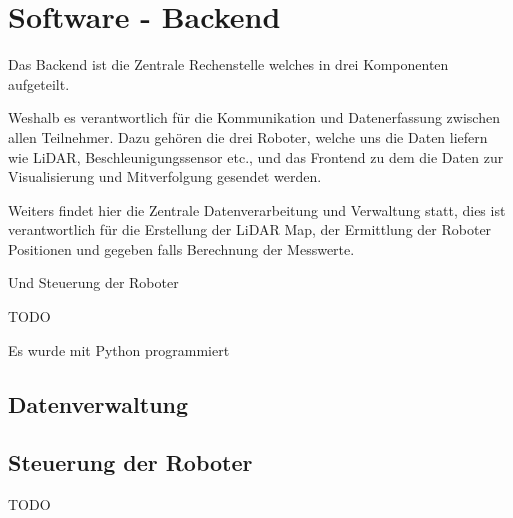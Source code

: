 
\chapter{Software - Backend}
\label{sec:software_backend}
Das Backend ist die Zentrale Rechenstelle welches in drei Komponenten aufgeteilt.

Weshalb es verantwortlich für die Kommunikation und Datenerfassung zwischen allen Teilnehmer. 
Dazu gehören die drei Roboter, welche uns die Daten liefern wie LiDAR, Beschleunigungssensor etc., 
und das Frontend zu dem die Daten zur Visualisierung und Mitverfolgung gesendet werden.

Weiters findet hier die Zentrale Datenverarbeitung und Verwaltung statt, 
dies ist verantwortlich für die Erstellung der LiDAR Map, 
der Ermittlung der Roboter Positionen 
und gegeben falls Berechnung der Messwerte. 

Und Steuerung der Roboter

TODO

Es wurde mit Python programmiert

\section{Datenverwaltung}
\label{subsec:backend_data}


\section{Steuerung der Roboter}
\label{subsec:backend_robot_detection}
TODO 
